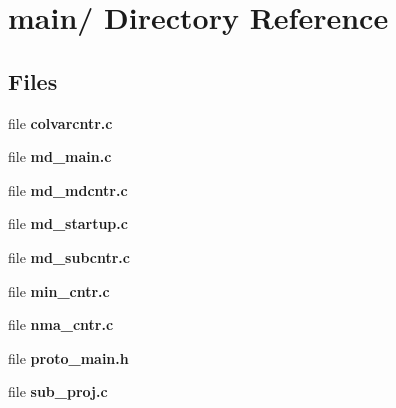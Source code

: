 \section{main/ Directory Reference}
\label{dir_253aabe478f2cd14b82c76cfec474541}
\subsection*{Files}
\begin{CompactItemize}
\item 
file {\bf colvarcntr.c}
\item 
file {\bf md\_\-main.c}
\item 
file {\bf md\_\-mdcntr.c}
\item 
file {\bf md\_\-startup.c}
\item 
file {\bf md\_\-subcntr.c}
\item 
file {\bf min\_\-cntr.c}
\item 
file {\bf nma\_\-cntr.c}
\item 
file {\bf proto\_\-main.h}
\item 
file {\bf sub\_\-proj.c}
\end{CompactItemize}
